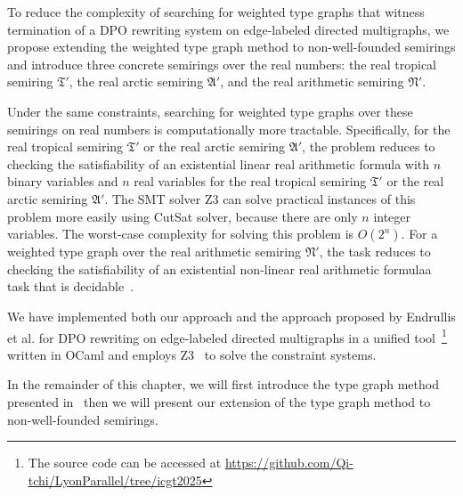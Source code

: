 To reduce the complexity of searching for weighted type graphs that witness termination of a DPO rewriting system on edge-labeled directed multigraphs, we propose extending the weighted type graph method to non-well-founded semirings and introduce three concrete semirings over the real numbers: the real tropical semiring $\mathfrak{T}'$, the real arctic semiring $\mathfrak{A}'$, and the real arithmetic semiring $\mathfrak{N}'$. 


Under the same constraints, searching for weighted type graphs over these semirings on real numbers is computationally more tractable. Specifically,
for the real tropical semiring $\mathfrak{T}'$ or the real arctic semiring $\mathfrak{A}'$, the problem reduces 
to checking the satisfiability of an 
existential linear real arithmetic formula with $n$ binary variables and $n$ real variables for the real tropical semiring $\mathfrak{T}'$ or the real arctic semiring $\mathfrak{A}'$. 
The SMT solver Z3 can solve practical instances of this problem more easily using CutSat solver, because there are only $n$ integer variables. The worst-case complexity for solving this problem is $O(2^n)$.
For a weighted type graph over the real arithmetic semiring $\mathfrak{N}'$, the task reduces to checking the satisfiability of 
an existential non-linear real arithmetic formula\textemdash a task that is decidable~\cite{collins1974quantifier,z3realarithmetic}.


We have implemented both our approach and the approach proposed by Endrullis et al. \cite{endrullis2024generalized_arxiv_v2} for DPO rewriting on edge-labeled directed multigraphs in a unified tool~\footnote{The source code can be accessed at \url{https://github.com/Qi-tchi/LyonParallel/tree/icgt2025}} written in OCaml and employs Z3~\cite{de2008z3} to solve the constraint systems.

In the remainder of this chapter, we will first introduce the type graph method presented in~\cite{endrullis2024generalized_arxiv_v2}
 then we will present our extension of the type graph method to non-well-founded semirings.
